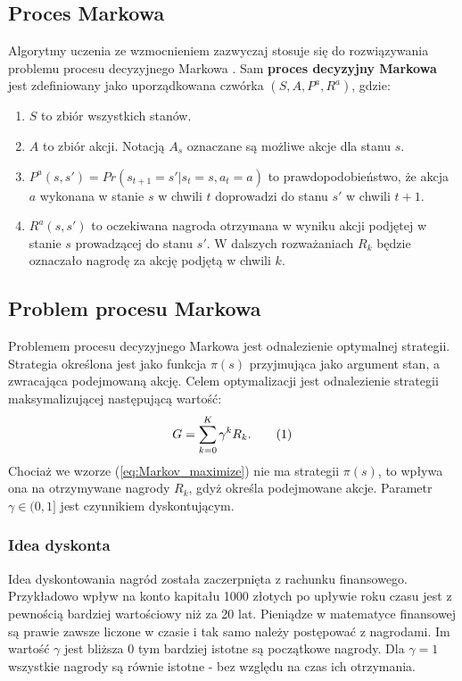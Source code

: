 \documentclass[12pt]{book}
\theoremstyle{plain}
\newcommand\addtag{\refstepcounter{equation}
\renewcommand{\labelenumii}{\theenumii}
\renewcommand{\theenumii}{\theenumi.\arabic{enumii}.}
\tag{\theequation}}
\newcommand{\myref}[1]{(\ref{#1})}
\begin{document}
\subsection*{Proces Markowa}
Algorytmy uczenia ze wzmocnieniem zazwyczaj stosuje się do rozwiązywania problemu procesu decyzyjnego Markowa \cite{reinforcementBook}. Sam \textbf{proces decyzyjny Markowa} jest zdefiniowany jako uporządkowana czwórka $(S,A,P^a,R^a)$, gdzie:
\begin{enumerate}
	\item $S$ to zbiór wszystkich stanów.
	\item $A$ to zbiór akcji. Notacją $A_s$ oznaczane są możliwe akcje dla stanu $s$.
	\item $P^a(s,s')=Pr(s_{t+1}=s'|s_t=s,a_t=a)$ to prawdopodobieństwo, że akcja $a$ wykonana w stanie $s$ w chwili $t$ doprowadzi do stanu $s'$ w chwili $t+1$.
	\item $R^a(s,s')$ to oczekiwana nagroda otrzymana w wyniku akcji podjętej w stanie $s$ prowadzącej do stanu $s'$. W dalszych rozważaniach $R_k$ będzie oznaczało nagrodę za akcję podjętą w chwili $k$.
\end{enumerate}
\subsection*{Problem procesu Markowa}
Problemem procesu decyzyjnego Markowa jest odnalezienie optymalnej strategii. Strategia określona jest jako funkcja $\pi(s)$ przyjmująca jako argument stan, a zwracająca podejmowaną akcję. Celem optymalizacji jest odnalezienie strategii maksymalizującej następującą wartość:
\[
G=\sum_{k=0}^{K} \gamma^k R_{k}. \addtag \label{eq:Markov_maximize}
\]
Chociaż we wzorze \myref{eq:Markov_maximize} nie ma strategii $\pi(s)$, to wpływa ona na otrzymywane nagrody $R_{k}$, gdyż określa podejmowane akcje. Parametr $\gamma \in (0,1]$ jest czynnikiem dyskontującym. 
\subsubsection*{Idea dyskonta}
Idea dyskontowania nagród została zaczerpnięta z rachunku finansowego. Przykładowo wpływ na konto kapitału 1000 złotych po upływie roku czasu jest z pewnością bardziej wartościowy niż za 20 lat. Pieniądze w matematyce finansowej są prawie zawsze liczone w czasie i tak samo należy postępować z nagrodami. Im wartość $\gamma$ jest bliższa 0 tym bardziej istotne są początkowe nagrody. Dla $\gamma=1$ wszystkie nagrody są równie istotne - bez względu na czas ich otrzymania.\\
\end{document}
